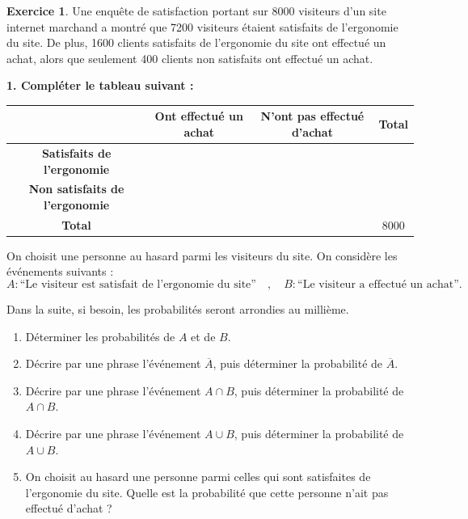 \documentclass{exam}
\theoremstyle{definition}
\newtheorem{exercice}{Exercice}
\begin{document}
\large


\setlength\parindent{0pt}

\vspace{2mm}
\noindent
{}
\large

\begin{exercice}

Une enquête de satisfaction portant sur 8000 visiteurs d'un site internet marchand a montré que 7200 visiteurs étaient satisfaits de l'ergonomie du site. De plus, 1600 clients satisfaits de l'ergonomie du site ont effectué un achat, alors que seulement 400 clients non satisfaits ont effectué un achat.

\bigskip

\textbf{1. Compléter le tableau suivant :}

\begin{center}
  \renewcommand{\arraystretch}{1.5}
\begin{tabular}{|c|c|c|c|}
\hline
 & \textbf{Ont effectué un achat} & \textbf{N'ont pas effectué d'achat} & \textbf{Total} \\
\hline
\textbf{Satisfaits de l'ergonomie} & & & \\
\hline
\textbf{Non satisfaits de l'ergonomie} & & & \\
\hline
\textbf{Total} & & & 8000 \\
\hline
\end{tabular}
\end{center}

\medskip

On choisit une personne au hasard parmi les visiteurs du site. On considère les événements suivants :
\[
A : \text{``Le visiteur est satisfait de l'ergonomie du site''}
\quad,\quad
B : \text{``Le visiteur a effectué un achat''}.
\]

Dans la suite, si besoin, les probabilités seront arrondies au millième.

\begin{enumerate}
  \item[2.] Déterminer les probabilités de $A$ et de $B$.
  \item[3.] Décrire par une phrase l'événement $\overline{A}$, puis déterminer la probabilité de $\overline{A}$.
  \item[4.] Décrire par une phrase l'événement $A \cap B$, puis déterminer la probabilité de $A \cap B$.
  \item[5.] Décrire par une phrase l'événement $A \cup B$, puis déterminer la probabilité de $A \cup B$.
  \item[6.] On choisit au hasard une personne parmi celles qui sont satisfaites de l'ergonomie du site. Quelle est la probabilité que cette personne n'ait pas effectué d'achat ?
\end{enumerate}


\end{exercice}
\end{document}
